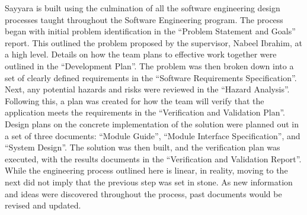 \documentclass{article}
\begin{document}
Sayyara is built using the culmination of all the software engineering design processes taught
throughout the Software Engineering program. The process began with initial problem identification
in the ``Problem Statement and Goals'' report. This outlined the problem proposed by the
supervisor, Nabeel Ibrahim, at a high level. Details on how the team plans to effective work
together were outlined in the ``Development Plan''. The problem was then broken down into a set of
clearly defined requirements in the ``Software Requirements Specification''. Next, any potential
hazards and risks were reviewed in the ``Hazard Analysis''. Following this, a plan was created for
how the team will verify that the application meets the requirements in the ``Verification and
Validation Plan''. Design plans on the concrete implementation of the solution were planned out in
a set of three documents: ``Module Guide'', ``Module Interface Specification'', and ``System
Design''. The solution was then built, and the verification plan was executed, with the results
documents in the ``Verification and Validation Report''. While the engineering process outlined
here is linear, in reality, moving to the next did not imply that the previous step was set in
stone. As new information and ideas were discovered throughout the process, past documents would be
revised and updated.
\end{document}
